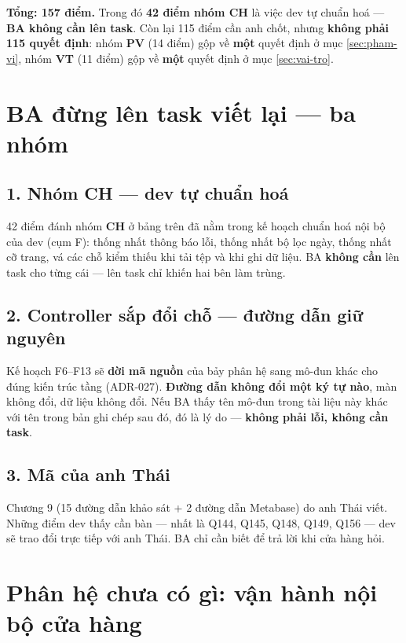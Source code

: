 \textbf{Tổng: 157 điểm.} Trong đó \textbf{42 điểm nhóm CH} là việc dev tự chuẩn hoá ---
\textbf{BA không cần lên task}. Còn lại 115 điểm cần anh chốt, nhưng \textbf{không phải 115
quyết định}: nhóm \textbf{PV} (14 điểm) gộp về \textbf{một} quyết định ở mục \ref{sec:pham-vi},
nhóm \textbf{VT} (11 điểm) gộp về \textbf{một} quyết định ở mục \ref{sec:vai-tro}.

\section{BA đừng lên task viết lại --- ba nhóm}

\subsection*{1. Nhóm CH --- dev tự chuẩn hoá}

42 điểm đánh nhóm \textbf{CH} ở bảng trên đã nằm trong kế hoạch chuẩn hoá nội bộ của dev (cụm
F): thống nhất thông báo lỗi, thống nhất bộ lọc ngày, thống nhất cỡ trang, vá các chỗ kiểm
thiếu khi tải tệp và khi ghi dữ liệu. BA \textbf{không cần} lên task cho từng cái --- lên task
chỉ khiến hai bên làm trùng.

\subsection*{2. Controller sắp đổi chỗ --- đường dẫn giữ nguyên}

Kế hoạch F6--F13 sẽ \textbf{dời mã nguồn} của bảy phân hệ sang mô-đun khác cho đúng kiến trúc
tầng (ADR-027). \textbf{Đường dẫn không đổi một ký tự nào}, màn không đổi, dữ liệu không đổi.
Nếu BA thấy tên mô-đun trong tài liệu này khác với tên trong bản ghi chép sau đó, đó là lý do
--- \textbf{không phải lỗi, không cần task}.

\subsection*{3. Mã của anh Thái}

Chương 9 (15 đường dẫn khảo sát + 2 đường dẫn Metabase) do anh Thái viết. Những điểm dev thấy
cần bàn --- nhất là Q144, Q145, Q148, Q149, Q156 --- dev sẽ trao đổi trực tiếp với anh Thái.
BA chỉ cần biết để trả lời khi cửa hàng hỏi.

\section{Phân hệ chưa có gì: vận hành nội bộ cửa hàng}

